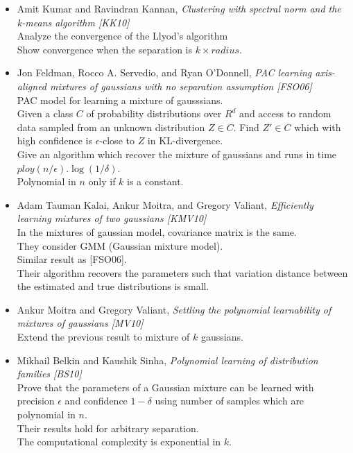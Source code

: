 \documentclass[12pt]{article}
\begin{document}
\begin{itemize}
	\item Amit Kumar and Ravindran Kannan, {\em Clustering with spectral norm and the k-means algorithm [KK10]}\\
	Analyze the convergence of the Llyod's algorithm\\
	Show convergence when the separation is $k \times radius$. 
	\item Jon Feldman, Rocco A. Servedio, and Ryan O’Donnell, {\em PAC learning axis-aligned mixtures of gaussians with no separation assumption [FSO06]}\\
	PAC model for learning a mixture of gausssians.\\
	Given a class $C$ of probability distributions over $R^d$ and access to random data sampled from an unknown distribution $Z \in C$. Find $Z' \in C$ which with high confidence is $\epsilon$-close to $Z$ in KL-divergence.\\
	Give an algorithm which recover the mixture of gaussians and runs in time $ploy(n/\epsilon).\log(1/\delta)$.\\
	Polynomial in $n$ only if $k$ is a constant. 
	
	\item Adam Tauman Kalai, Ankur Moitra, and Gregory Valiant, {\em Efficiently learning mixtures of two gaussians [KMV10]}\\
	In the mixtures of gaussian model, covariance matrix is the same.\\
	They consider GMM (Gaussian mixture model).\\
	Similar result as [FSO06].\\
	Their algorithm recovers the parameters such that variation distance between the estimated and true distributions is small.
	
	\item Ankur Moitra and Gregory Valiant, {\em Settling the polynomial learnability of mixtures of gaussians [MV10]}\\
	Extend the previous result to mixture of $k$ gaussians.
	
	\item Mikhail Belkin and Kaushik Sinha, {\em Polynomial learning of distribution families [BS10]}\\
	Prove that the parameters of a Gaussian mixture can be learned with precision $\epsilon$ and confidence $1−\delta$ using number of samples which are polynomial in $n$.\\
	Their results hold for arbitrary separation.\\
	The computational complexity is exponential in $k$.
	

\end{itemize}
\end{document}
